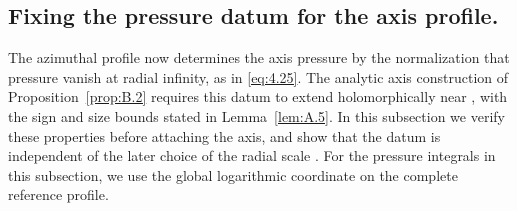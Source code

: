 \subsection{Fixing the pressure datum for the axis profile.}\label{sec:A.4}
The azimuthal profile  now determines the axis pressure
 by the normalization that pressure vanish at radial infinity, as in
\eqref{eq:4.25}. The analytic axis construction of Proposition~\ref{prop:B.2} requires this
datum to extend holomorphically near , with the sign and size
bounds stated in Lemma~\ref{lem:A.5}. In this subsection we verify these properties before
attaching the axis, and show that the datum is independent of the later choice of the radial
scale . For the pressure integrals in this subsection, we use the
global logarithmic coordinate  on the complete reference
profile.


